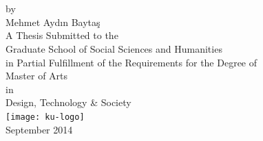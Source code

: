 \begin{titlepage}
\begin{center}

~\\[2cm]

{\huge \thetitle}\\[1cm]

by\\[1cm]

{\huge Mehmet Aydın Baytaş}\\[4cm]

A Thesis Submitted to the\\[2mm]

{\Large Graduate School of Social Sciences and Humanities}\\[2mm]

in Partial Fulfillment of the Requirements for the Degree of\\[2mm]

{\Large Master of Arts}\\[2mm]

in\\[2mm]

{\Large Design, Technology \& Society}\\[5cm]

\texttt{[image: ku-logo]}~\\[1cm]

September 2014\\[2cm]

\end{center}
\end{titlepage}